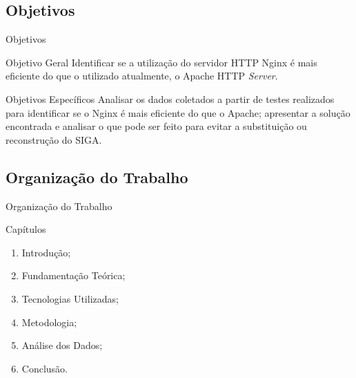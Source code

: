 \documentclass[aspectratio=43]{beamer}
\begin{document}
\subsection{Objetivos}
\begin{frame}{Objetivos}
	\begin{block}{Objetivo Geral}
		Identificar se a utilização do servidor HTTP Nginx é mais eficiente do 
		que o utilizado atualmente, o Apache HTTP \textit{Server}.
	\end{block} \pause
	\begin{block}{Objetivos Específicos}
		Analisar os dados coletados a partir de testes realizados para 
		identificar se o Nginx é mais eficiente do que o Apache; apresentar a 
		solução encontrada e analisar o que pode ser feito para evitar a 
		substituição ou reconstrução do SIGA.
	\end{block}
\end{frame}

\subsection{Organização do Trabalho}

\begin{frame}{Organização do Trabalho}
	\begin{block}{Capítulos}
		\begin{enumerate}
			\item Introdução;
			\item Fundamentação Teórica;
			\item Tecnologias Utilizadas;
			\item Metodologia;
			\item Análise dos Dados;
			\item Conclusão.
		\end{enumerate}
	\end{block}
\end{frame}


%


%

\end{document}
